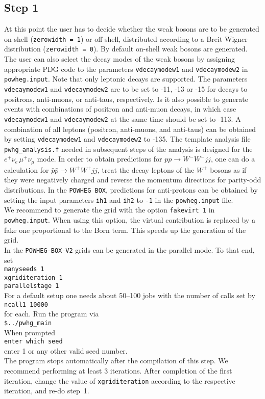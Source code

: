 \documentclass[a4paper,11pt]{article}
\newcommand\POWHEGBOX{{\tt POWHEG BOX}}
\newcommand\POWHEGBOXV{{\tt POWHEG-BOX-V2}}
\begin{document}
\subsection*{Step 1}
%
At this point the user
has to decide whether the weak bosons are to be generated on-shell
({\tt zerowidth = 1}) or off-shell, distributed according to a
Breit-Wigner distribution ({\tt zerowidth = 0}).  By default on-shell
weak bosons are generated. The user can also select the decay modes of
the weak bosons by assigning appropriate PDG code to the parameters
{\tt vdecaymodew1} and {\tt vdecaymodew2} in {\tt powheg.input}. Note
that only leptonic decays are supported. 
%
The parameters {\tt vdecaymodew1} and {\tt vdecaymodew2} are to be set to -11, -13 or -15  for decays to
positrons, anti-muons, or anti-taus, respectively. Is it also
possible to generate events with combinations of positron and anti-muon
decays, in which case {\tt vdecaymodew1} and {\tt vdecaymodew2} at the same time should
be set to -113. A combination of all leptons (positron, anti-muons, and 
anti-taus) can be obtained by setting {\tt vdecaymodew1} and {\tt vdecaymodew2}
to -135.
%
The template analysis file
{\tt pwhg\_analysis.f} needed in subsequent steps of the analysis is
designed for the $e^+\nu_e \,\mu^+\nu_{\mu}$ mode.
%
In order to obtain predictions for $pp\to W^-W^-jj$, one can do a calculation for $\bar p\bar p\to W^+W^+jj$, treat the decay leptons of the $W^+$ bosons as if they were negatively charged and reverse the momentum directions for parity-odd distributions. In the \POWHEGBOX{}, predictions for anti-protons can be obtained by 
setting the input parameters {\tt ih1} and {\tt ih2} to {\tt -1} in the {\tt powheg.input} file.  
%
\\[2ex]
%
We recommend to generate the grid with the option {\tt fakevirt 1} in
{\tt powheg.input}. When using this option, the virtual contribution
is replaced by a fake one proportional to the Born term. This speeds
up the generation of the grid.
\\[2ex]
In the \POWHEGBOXV{} grids can be generated in the parallel mode. To that end, set
\\[2ex]
{\tt manyseeds   1}
\\
{\tt xgriditeration   1}
\\
{\tt parallelstage     1}
\\[2ex]
For a default setup one needs about 50--100 jobs with the number of calls set by
\\[2ex] 
{\tt ncall1 10000}
\\[2ex] 
for each. 
%
Run the program via
\\[2ex]
{\tt \$../pwhg\_main}
\\[2ex]
When prompted
\\[2ex]
{\tt enter which seed}
\\[2ex]
enter 1 or any other valid seed number.
\\[2ex]
The program stops automatically after the compilation of
this step.
%
We recommend performing at least  3 iterations. After completion of the first iteration, change the value of {\tt xgriditeration} according to the respective iteration, and re-do step~1. 
%
\end{document}
